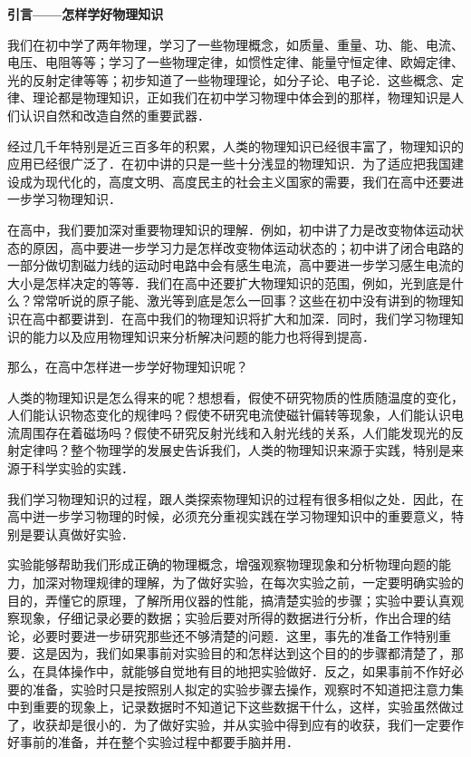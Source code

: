 \setcounter{page}{1}
\pagestyle{foreword}
\null\vspace{1em}
\begin{center}
    \label{foreword}
    \textbf{引言——怎样学好物理知识}
    \null{}
\end{center}
\normalsize

我们在初中学了两年物理，学习了一些物理概念，如质量、重量、功、能、电流、电压、电阻等等；学习了一些物理定律，如惯性定律、能量守恒定律、欧姆定律、光的反射定律等等；初步知道了一些物理理论，如分子论、电子论．这些概念、定律、理论都是物理知识，正如我们在初中学习物理中体会到的那样，物理知识是人们认识自然和改造自然的重要武器．

经过几千年特别是近三百多年的积累，人类的物理知识已经很丰富了，物理知识的应用已经很广泛了．在初中讲的只是一些十分浅显的物理知识．为了适应把我国建设成为现代化的，高度文明、高度民主的社会主义国家的需要，我们在高中还要进一步学习物理知识．

在高中，我们要加深对重要物理知识的理解．例如，初中讲了力是改变物体运动状态的原因，高中要进一步学习力是怎样改变物体运动状态的；初中讲了闭合电路的一部分做切割磁力线的运动时电路中会有感生电流，高中要进一步学习感生电流的大小是怎样决定的等等．我们在高中还要扩大物理知识的范围，例如，光到底是什么？常常听说的原子能、激光等到底是怎么一回事？这些在初中没有讲到的物理知识在高中都要讲到．在高中我们的物理知识将扩大和加深．同时，我们学习物理知识的能力以及应用物理知识来分析解决问题的能力也将得到提高．

那么，在高中怎样进一步学好物理知识呢？

\vspace*{0.5em}
\vspace*{0.5em}

人类的物理知识是怎么得来的呢？想想看，假使不研究物质的性质随温度的变化，人们能认识物态变化的规律吗？假使不研究电流使磁针偏转等现象，人们能认识电流周围存在着磁场吗？假使不研究反射光线和入射光线的关系，人们能发现光的反射定律吗？整个物理学的发展史告诉我们，人类的物理知识来源于实践，特别是来源于科学实验的实践．

我们学习物理知识的过程，跟人类探索物理知识的过程有很多相似之处．因此，在高中迸一步学习物理的时候，必须充分重视实践在学习物理知识中的重要意义，特别是要认真做好实验．

实验能够帮助我们形成正确的物理概念，增强观察物理现象和分析物理向题的能力，加深对物理规律的理解，为了做好实验，在每次实验之前，一定要明确实验的目的，弄懂它的原理，了解所用仪器的性能，搞清楚实验的步骤；实验中要认真观察现象，仔细记录必要的数据；实验后要对所得的数据进行分析，作出合理的结论，必要时要进一步研究那些还不够清楚的问题．这里，事先的准备工作特别重要．这是因为，我们如果事前对实验目的和怎样达到这个目的的步骤都清楚了，那么，在具体操作中，就能够自觉地有目的地把实验做好．反之，如果事前不作好必要的准备，实验时只是按照别人拟定的实验步骤去操作，观察时不知道把注意力集中到重要的现象上，记录数据时不知道记下这些数据干什么，这样，实验虽然做过了，收获却是很小的．为了做好实验，并从实验中得到应有的收获，我们一定要作好事前的准备，并在整个实验过程中都要手脑并用．

